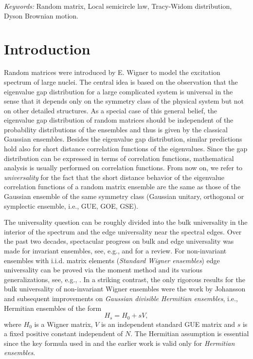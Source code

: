 \documentclass[draft]{article}
\newcommand{\be}{\begin{equation}}
\newcommand{\ee}{\end{equation}}
\numberwithin{equation}{section}
\numberwithin{theorem}{section}
\numberwithin{definition}{section}
\numberwithin{remark}{section}
\begin{document}
\medskip


\medskip

{\it Keywords:}  Random matrix, Local semicircle law,
Tracy-Widom distribution, Dyson Brownian motion.

\medskip





\newpage 

\section{Introduction}


Random matrices were introduced by E.  Wigner to model the excitation spectrum of  large nuclei. 
The central idea is based on the observation that
the eigenvalue gap distribution   for a large complicated system is universal
 in the sense that it depends only on the symmetry class
 of the physical system but not  on other  detailed structures.  As a  special 
 case of this general belief, 
 the eigenvalue gap distribution of random matrices should be independent of the
 probability distributions of the ensembles and thus is given by the classical Gaussian ensembles.  
Besides the eigenvalue gap distribution, similar predictions 
 hold also for short distance correlation functions of the eigenvalues. Since the gap distribution 
can be expressed in terms 
 of correlation functions, mathematical analysis is usually performed on correlation functions.
 {F}rom now on, we refer to {\it  universality} for the fact  that the  short distance behavior of
the eigenvalue correlation functions of a random matrix ensemble are the same as those of 
 the Gaussian ensemble of the same symmetry class
(Gaussian unitary, orthogonal or symplectic ensemble, i.e., GUE, GOE,
GSE).
   



 The universality question can be roughly divided into the bulk universality 
in the interior of the spectrum and 
 the edge universality near the spectral edges.   
 Over the past two decades,  spectacular  progress on  bulk and  edge universality   
 was made for invariant ensembles, see, e.g., 
\cite{BI, DKMVZ1, DKMVZ2, PS} and \cite{AGZ, De1, De2} for a review.   For non-invariant ensembles
with i.i.d. matrix elements ({\it Standard Wigner ensembles})  edge universality can be  proved 
via the moment method and its various  generalizations, see, e.g.,  \cite{SS, Sosh, So1}. 
In a striking contrast, the only rigorous  results  for the bulk universality of 
non-invariant Wigner ensembles
were the work by Johansson \cite{J} and subsequent improvements \cite{BP, J1} on
  {\it  Gaussian divisible Hermitian ensembles}, i.e., Hermitian ensembles   of the form
\be
H_s=  H_0+ s V,
\label{HaV}
\ee
where $H_0$  is a Wigner matrix, 
$V$ is an independent standard GUE matrix
and $s$ is a fixed positive constant independent of $N$. The Hermitian assumption is essential 
since  the key formula used  in \cite {J} 
and the earlier work \cite{BH} is valid only for {\it Hermitian ensembles}.
\end{document}
